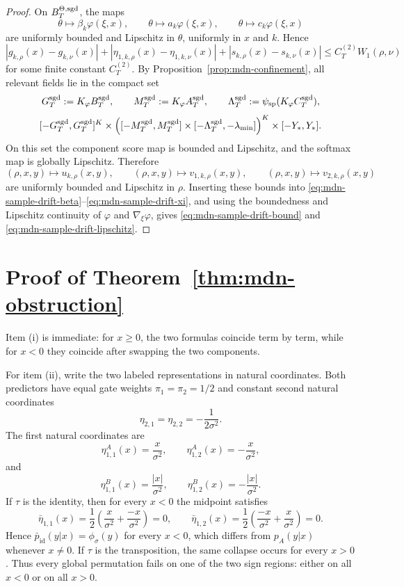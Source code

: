 \documentclass[11pt]{article}
\theoremstyle{definition}
\begin{document}
\begin{proof}
On $B_T^{\Theta,\rm sgd}$, the maps
\[
  \theta\mapsto \beta_k\varphi(\xi,x),
  \qquad
  \theta\mapsto a_k\varphi(\xi,x),
  \qquad
  \theta\mapsto c_k\varphi(\xi,x)
\]
are uniformly bounded and Lipschitz in $\theta$, uniformly in $x$ and $k$.
Hence
\[
  |g_{k,\rho}(x)-g_{k,\nu}(x)|
  +
  |\eta_{1,k,\rho}(x)-\eta_{1,k,\nu}(x)|
  +
  |s_{k,\rho}(x)-s_{k,\nu}(x)|
  \le
  C_T^{(2)}W_1(\rho,\nu)
\]
for some finite constant $C_T^{(2)}$. By Proposition~\ref{prop:mdn-confinement},
all relevant fields lie in the compact set
\[
  G_T^{\rm sgd}:=K_\varphi B_T^{\rm sgd},
  \qquad
  M_T^{\rm sgd}:=K_\varphi A_T^{\rm sgd},
  \qquad
  \Lambda_T^{\rm sgd}:=\psi_{\rm sp}(K_\varphi C_T^{\rm sgd}),
\]
\[
  [-G_T^{\rm sgd},G_T^{\rm sgd}]^K
  \times
  \Big(
    [-M_T^{\rm sgd},M_T^{\rm sgd}]
    \times
    [-\Lambda_T^{\rm sgd},-\lambda_{\min}]
  \Big)^K
  \times
  [-Y_\ast,Y_\ast].
\]
On this set the component score map is bounded and Lipschitz, and the softmax
map is globally Lipschitz. Therefore
\[
  (\rho,x,y)\mapsto u_{k,\rho}(x,y),
  \qquad
  (\rho,x,y)\mapsto v_{1,k,\rho}(x,y),
  \qquad
  (\rho,x,y)\mapsto v_{2,k,\rho}(x,y)
\]
are uniformly bounded and Lipschitz in $\rho$. Inserting these bounds into
\eqref{eq:mdn-sample-drift-beta}--\eqref{eq:mdn-sample-drift-xi}, and using the
boundedness and Lipschitz continuity of $\varphi$ and $\nabla_\xi\varphi$,
gives \eqref{eq:mdn-sample-drift-bound} and
\eqref{eq:mdn-sample-drift-lipschitz}.
\end{proof}

\section{Proof of Theorem~\ref{thm:mdn-obstruction}}
\label{app:obstruction-proof}

Item (i) is immediate: for $x\ge 0$, the two formulas coincide term by term,
while for $x<0$ they coincide after swapping the two components.

For item (ii), write the two labeled representations in natural coordinates.
Both predictors have equal gate weights $\pi_1=\pi_2=1/2$ and constant second
natural coordinates
\[
  \eta_{2,1}=\eta_{2,2}=-\frac{1}{2\sigma^2}.
\]
The first natural coordinates are
\[
  \eta_{1,1}^A(x)=\frac{x}{\sigma^2},
  \qquad
  \eta_{1,2}^A(x)=-\frac{x}{\sigma^2},
\]
and
\[
  \eta_{1,1}^B(x)=\frac{|x|}{\sigma^2},
  \qquad
  \eta_{1,2}^B(x)=-\frac{|x|}{\sigma^2}.
\]
If $\tau$ is the identity, then for every $x<0$ the midpoint satisfies
\[
  \bar\eta_{1,1}(x)
  =
  \frac{1}{2}\left(\frac{x}{\sigma^2}+\frac{-x}{\sigma^2}\right)=0,
  \qquad
  \bar\eta_{1,2}(x)
  =
  \frac{1}{2}\left(\frac{-x}{\sigma^2}+\frac{x}{\sigma^2}\right)=0.
\]
Hence $\bar p_{\mathrm{id}}(y|x)=\phi_\sigma(y)$ for every $x<0$, which differs
from $p_A(y|x)$ whenever $x\ne 0$. If $\tau$ is the transposition, the same
collapse occurs for every $x>0$. Thus every global permutation fails on one of
the two sign regions: either on all $x<0$ or on all $x>0$.
\end{document}
